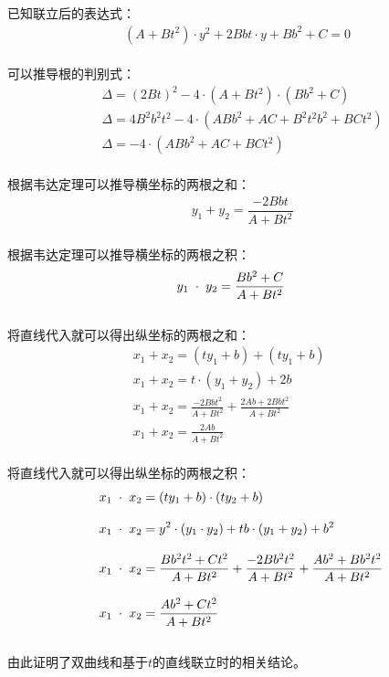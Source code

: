 \documentclass[UTF8]{ctexart}
\begin{document}
    已知联立后的表达式：
    \begin{align}
        \left(A+Bt^2\right)\cdot y^2+2Bbt\cdot y+Bb^2+C=0
    \end{align}\\
    可以推导根的判别式：
    \begin{align}
        &\Delta=(2Bt)^2-4\cdot\left(A+Bt^2\right)\cdot\left(Bb^2+C\right)\\[3mm]
        &\Delta=4B^2b^2t^2-4\cdot\left(ABb^2+AC+B^2t^2b^2+BCt^2\right)\\[3mm]
        &\Delta=-4\cdot\left(ABb^2+AC+BCt^2\right)
    \end{align}\\
    根据韦达定理可以推导横坐标的两根之和：
    \begin{align}
        &y_1+y_2=\dfrac{-2Bbt}{A+Bt^2}
    \end{align}\\
    根据韦达定理可以推导横坐标的两根之积：
    \begin{align}
        &y_1\hspace{3.0pt}\cdot\hspace{3.0pt}y_2=\dfrac{Bb^2+C}{A+Bt^2}
    \end{align}\\    
    将直线代入就可以得出纵坐标的两根之和：\vspace{3pt}
    \begin{align}
        &x_1+x_2=(ty_1+b)+(ty_1+b)\\[3mm]
        &x_1+x_2=t\cdot(y_1+y_2)+2b\\[3mm]
        &x_1+x_2=\frac{-2Bbt^2}{A+Bt^2}+\frac{2Ab+2Bbt^2}{A+Bt^2}~~~~~~~~~~~~~~~~~~~~~~\\[3mm]
        &x_1+x_2=\frac{2Ab}{A+Bt^2}
    \end{align}\\
    将直线代入就可以得出纵坐标的两根之积：\vspace{3pt}
    \begin{align}
        &~~x_1\hspace{3.0pt}\cdot\hspace{3.0pt}x_2=(ty_1+b)\cdot(ty_2+b)\\[3mm]
        &~~x_1\hspace{3.0pt}\cdot\hspace{3.0pt}x_2=y^2\cdot(y_1\cdot y_2)+tb\cdot(y_1+y_2)+b^2\\[3mm]
        &~~x_1\hspace{3.0pt}\cdot\hspace{3.0pt}x_2=\frac{Bb^2t^2+Ct^2}{A+Bt^2}+\frac{-2Bb^2t^2}{A+Bt^2}+\frac{Ab^2+Bb^2t^2}{A+Bt^2}\\[3mm]
        &~~x_1\hspace{3.0pt}\cdot\hspace{3.0pt}x_2=\frac{Ab^2+Ct^2}{A+Bt^2}
    \end{align}\\
    由此证明了双曲线和基于$t$的直线联立时的相关结论。
\end{document}
